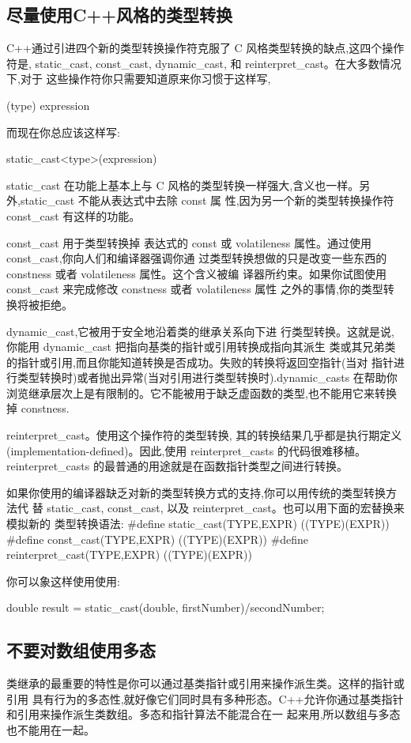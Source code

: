 \subsection{尽量使用C++风格的类型转换}
C++通过引进四个新的类型转换操作符克服了 C 风格类型转换的缺点,这四个操作符是, static_cast, const_cast, dynamic_cast, 和 reinterpret_cast。在大多数情况下,对于 这些操作符你只需要知道原来你习惯于这样写,

(type) expression 

而现在你总应该这样写: 

static_cast<type>(expression)

static_cast 在功能上基本上与 C 风格的类型转换一样强大,含义也一样。另外,static_cast 不能从表达式中去除 const 属 性,因为另一个新的类型转换操作符 const_cast 有这样的功能。

const_cast 用于类型转换掉 表达式的 const 或 volatileness 属性。通过使用 const_cast,你向人们和编译器强调你通 过类型转换想做的只是改变一些东西的 constness 或者 volatileness 属性。这个含义被编 译器所约束。如果你试图使用 const_cast 来完成修改 constness 或者 volatileness 属性 之外的事情,你的类型转换将被拒绝。

dynamic_cast,它被用于安全地沿着类的继承关系向下进 行类型转换。这就是说,你能用 dynamic_cast 把指向基类的指针或引用转换成指向其派生 类或其兄弟类的指针或引用,而且你能知道转换是否成功。失败的转换将返回空指针(当对 指针进行类型转换时)或者抛出异常(当对引用进行类型转换时).dynamic_casts 在帮助你浏览继承层次上是有限制的。它不能被用于缺乏虚函数的类型,也不能用它来转换掉 constness.

reinterpret_cast。使用这个操作符的类型转换, 其的转换结果几乎都是执行期定义(implementation-defined)。因此,使用 reinterpret_casts 的代码很难移植。
reinterpret_casts 的最普通的用途就是在函数指针类型之间进行转换。

如果你使用的编译器缺乏对新的类型转换方式的支持,你可以用传统的类型转换方法代 替 static_cast, const_cast, 以及 reinterpret_cast。也可以用下面的宏替换来模拟新的 类型转换语法:
\#define static_cast(TYPE,EXPR) ((TYPE)(EXPR)) 
\#define const_cast(TYPE,EXPR) ((TYPE)(EXPR)) 
\#define reinterpret_cast(TYPE,EXPR) ((TYPE)(EXPR)) 

你可以象这样使用使用:

double result = static_cast(double, firstNumber)/secondNumber;

\subsection{不要对数组使用多态}
类继承的最重要的特性是你可以通过基类指针或引用来操作派生类。这样的指针或引用 具有行为的多态性,就好像它们同时具有多种形态。C++允许你通过基类指针和引用来操作派生类数组。多态和指针算法不能混合在一 起来用,所以数组与多态也不能用在一起。

